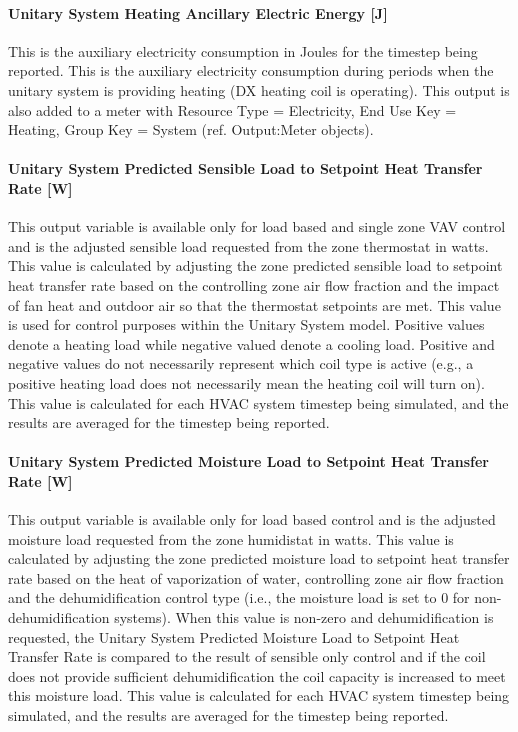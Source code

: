 \paragraph{Unitary System Heating Ancillary Electric Energy {[}J{]}}\label{unitary-system-heating-ancillary-electric-energy-j}

This is the auxiliary electricity consumption in Joules for the timestep being reported. This is the auxiliary electricity consumption during periods when the unitary system is providing heating (DX heating coil is operating). This output is also added to a meter with Resource Type = Electricity, End Use Key = Heating, Group Key = System (ref. Output:Meter objects).

\paragraph{Unitary System Predicted Sensible Load to Setpoint Heat Transfer Rate {[}W{]}}\label{unitary-system-sensible-load-to-setpoint-heat-transfer-rate-w}

This output variable is available only for load based and single zone VAV control and is the adjusted sensible load requested from the zone thermostat in watts. This value is calculated by adjusting the zone predicted sensible load to setpoint heat transfer rate based on the controlling zone air flow fraction and the impact of fan heat and outdoor air so that the thermostat setpoints are met. This value is used for control purposes within the Unitary System model. Positive values denote a heating load while negative valued denote a cooling load. Positive and negative values do not necessarily represent which coil type is active (e.g., a positive heating load does not necessarily mean the heating coil will turn on). This value is calculated for each HVAC system timestep being simulated, and the results are averaged for the timestep being reported.

\paragraph{Unitary System Predicted Moisture Load to Setpoint Heat Transfer Rate {[}W{]}}\label{unitary-system-predicted-moisture-load-to-setpoint-heat-transfer-rate-w}

This output variable is available only for load based control and is the adjusted moisture load requested from the zone humidistat in watts. This value is calculated by adjusting the zone predicted moisture load to setpoint heat transfer rate based on the heat of vaporization of water, controlling zone air flow fraction and the dehumidification control type (i.e., the moisture load is set to 0 for non-dehumidification systems). When this value is non-zero and dehumidification is requested, the Unitary System Predicted Moisture Load to Setpoint Heat Transfer Rate is compared to the result of sensible only control and if the coil does not provide sufficient dehumidification the coil capacity is increased to meet this moisture load. This value is calculated for each HVAC system timestep being simulated, and the results are averaged for the timestep being reported.


